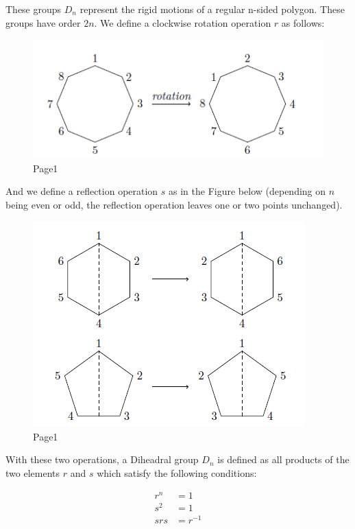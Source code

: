 
These groups \(D_n\) represent the rigid motions of a regular n-sided
polygon. These groups have order \(2n\). We define a clockwise rotation
operation \(r\) as follows:

\begin{figure}[H]
\centering
\includegraphics[scale=0.7]{images/groups_04_1.png}
\caption{Page1}
\end{figure}

And we define a reflection operation \(s\) as in the Figure below
(depending on \(n\) being even or odd, the reflection operation leaves
one or two points unchanged).

\begin{figure}[H]
\centering
\includegraphics[scale=0.7]{images/groups_04_2.png}
\caption{Page1}
\end{figure}

With these two operations, a Diheadral group \(D_n\) is defined as all
products of the two elements \(r\) and \(s\) which satisfy the following
conditions:

\begin{align*}
r^n &= 1 \\
s^2 &= 1 \\
srs &= r^{-1}
\end{align*}


